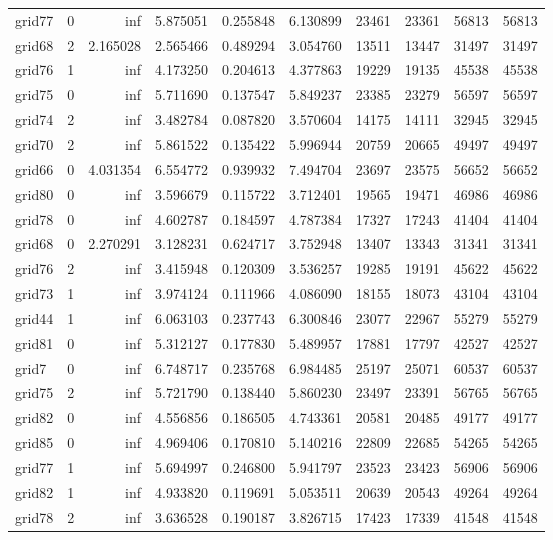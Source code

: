 \begin{longtable}{|l|r|r|r|r|r|r|r|r|r|}
grid77 & 0 & inf & 5.875051 & 0.255848 & 6.130899 & 23461 & 23361 & 56813 & 56813 \\
grid68 & 2 & 2.165028 & 2.565466 & 0.489294 & 3.054760 & 13511 & 13447 & 31497 & 31497 \\
grid76 & 1 & inf & 4.173250 & 0.204613 & 4.377863 & 19229 & 19135 & 45538 & 45538 \\
grid75 & 0 & inf & 5.711690 & 0.137547 & 5.849237 & 23385 & 23279 & 56597 & 56597 \\
grid74 & 2 & inf & 3.482784 & 0.087820 & 3.570604 & 14175 & 14111 & 32945 & 32945 \\
grid70 & 2 & inf & 5.861522 & 0.135422 & 5.996944 & 20759 & 20665 & 49497 & 49497 \\
grid66 & 0 & 4.031354 & 6.554772 & 0.939932 & 7.494704 & 23697 & 23575 & 56652 & 56652 \\
grid80 & 0 & inf & 3.596679 & 0.115722 & 3.712401 & 19565 & 19471 & 46986 & 46986 \\
grid78 & 0 & inf & 4.602787 & 0.184597 & 4.787384 & 17327 & 17243 & 41404 & 41404 \\
grid68 & 0 & 2.270291 & 3.128231 & 0.624717 & 3.752948 & 13407 & 13343 & 31341 & 31341 \\
grid76 & 2 & inf & 3.415948 & 0.120309 & 3.536257 & 19285 & 19191 & 45622 & 45622 \\
grid73 & 1 & inf & 3.974124 & 0.111966 & 4.086090 & 18155 & 18073 & 43104 & 43104 \\
grid44 & 1 & inf & 6.063103 & 0.237743 & 6.300846 & 23077 & 22967 & 55279 & 55279 \\
grid81 & 0 & inf & 5.312127 & 0.177830 & 5.489957 & 17881 & 17797 & 42527 & 42527 \\
grid7 & 0 & inf & 6.748717 & 0.235768 & 6.984485 & 25197 & 25071 & 60537 & 60537 \\
grid75 & 2 & inf & 5.721790 & 0.138440 & 5.860230 & 23497 & 23391 & 56765 & 56765 \\
grid82 & 0 & inf & 4.556856 & 0.186505 & 4.743361 & 20581 & 20485 & 49177 & 49177 \\
grid85 & 0 & inf & 4.969406 & 0.170810 & 5.140216 & 22809 & 22685 & 54265 & 54265 \\
grid77 & 1 & inf & 5.694997 & 0.246800 & 5.941797 & 23523 & 23423 & 56906 & 56906 \\
grid82 & 1 & inf & 4.933820 & 0.119691 & 5.053511 & 20639 & 20543 & 49264 & 49264 \\
grid78 & 2 & inf & 3.636528 & 0.190187 & 3.826715 & 17423 & 17339 & 41548 & 41548 \\

\end{longtable}

